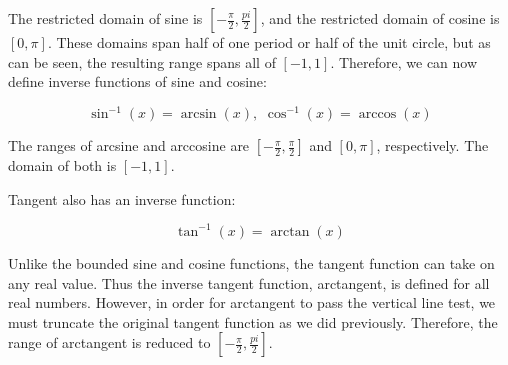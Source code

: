 \documentclass[11pt]{article}
\begin{document}
\begin{center}
\hspace{2cm}
\end{center}

The restricted domain of sine is $[-\frac{\pi}{2}, \frac{pi}{2}]$, and the restricted domain of cosine is $[0, \pi]$. These domains span half of one period or half of the unit circle, but as can be seen, the resulting range spans all of $[-1, 1]$. Therefore, we can now define inverse functions of sine and cosine: 

\[\sin^{-1}(x) = \arcsin(x), \,\, \cos^{-1}(x) = \arccos(x) \]

The ranges of arcsine and arccosine are $[-\frac{\pi}{2}, \frac{\pi}{2}]$ and $[0, \pi]$, respectively. The domain of both is $[-1, 1]$.

Tangent also has an inverse function:

\[\tan^{-1}(x) = \arctan(x) \]

Unlike the bounded sine and cosine functions, the tangent function can take on any real value. Thus the inverse tangent function, arctangent, is defined for all real numbers. However, in order for arctangent to pass the vertical line test, we must truncate the original tangent function as we did previously. Therefore, the range of arctangent is reduced to $[-\frac{\pi}{2}, \frac{pi}{2}]$.
\end{document}
